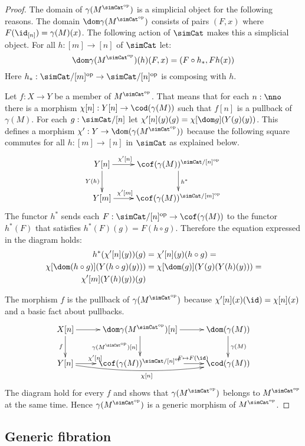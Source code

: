 \documentclass{tac}
\newcommand\hide[1]{}
\newcommand\cat\mathcal
\newcommand\ri{^*}
\newcommand\dual{^{\mathrm{op}}}
\newcommand\s{^{\simCat\dual}}
\newcommand\of{:}
\newcommand\gen\gamma
\newcommand\di{_*}
\begin{document}
\begin{proof} %
The domain of $\gen(M\s)$ is a simplicial object for the following reasons. The domain $\dom\gen(M\s)$ consists of pairs $(F,x)$ where $F(\id_{[n]}) = \gen(M)(x)$. The following action of $\simCat$ makes this a simplicial object. For all $h\of[m]\to[n]$ of $\simCat$ let:
\[\dom\gen(M\s)(h)(F,x) = (F\circ h\di, Fh(x))\] Here $h\di\of\simCat/[m]\dual\to\simCat/[n]\dual$ is composing with $h$.

Let $f\of X\to Y$ be a member of $M\s$. That means that for each $n\of\nno$ there is a morphism $\chi[n]\of Y[n] \to \cod(\gen(M))$ such that $f[n]$ is a pullback of $\gen(M)$. For each $g\of \simCat/[n]$ let $\chi'[n](y)(g) = \chi[\dom g](Y(g)(y))$. This defines a morphism $\chi'\of Y\to \dom (\gen(M\s))$ because the following square commutes for all $h\of [m]\to [n]$ in $\simCat$ as explained below.
\[\xymatrix{
Y[n]\ar[d]_{Y(h)} \ar[r]^(.3){\chi'[n]} & \cof(\gen(M))^{\simCat/[n]\dual} \ar[d]^{h\ri}\\
Y[m] \ar[r]^(.3){\chi'[m]} & \cof(\gen(M))^{\simCat/[m]\dual}
}\]
The functor $h\ri$ sends each $F\of\simCat/[n]\dual\to \cof(\gen(M))$ to the functor $h\ri(F)$ that satisfies $h\ri(F)(g) = F(h\circ g)$. Therefore the equation expressed in the diagram holds:
\begin{align*}
h\ri(\chi'[n](y))(g) &= \chi'[n](y)(h\circ g) = \\
\chi[\dom (h\circ g)](Y(h\circ g)(y))) &= \chi[\dom (g)](Y(g)(Y(h)(y))) =\\
\chi'[m](Y(h)(y))(g)
\end{align*}

The morphism $f$ is the pullback of $\gen(M\s)$ because $\chi'[n](x)(\id) = \chi[n](x)$ and a basic fact about pullbacks.
\[\xymatrix{
X[n]\ar[d]_f\ar[r] & \dom\gen(M\s)[n] \ar[r]\ar[d]_{\gen(M\s)[n]} & \dom(\gen(M))\ar[d]^{\gen(M)} \\
Y[n] \ar[r]^(.4){\chi'[n]} \ar@/_2ex/[rr]_{\chi[n]} & \cof(\gen(M))^{\simCat/[n]\dual} \ar[r]^(.6){F\mapsto F(\id)} & \cod(\gen(M))
}\]
The diagram hold for every $f$ and shows that $\gen(M\s)$ belongs to $M\s$ at the same time. Hence $\gen(M\s)$ is a generic morphism of $M\s$.
\end{proof}\hide{ Even if we cannot build $\cof(\gen(M))\s$ in $\cat S$, that does mean the pullback is not a modest morphism. }

\subsection{Generic fibration}
\end{document}
